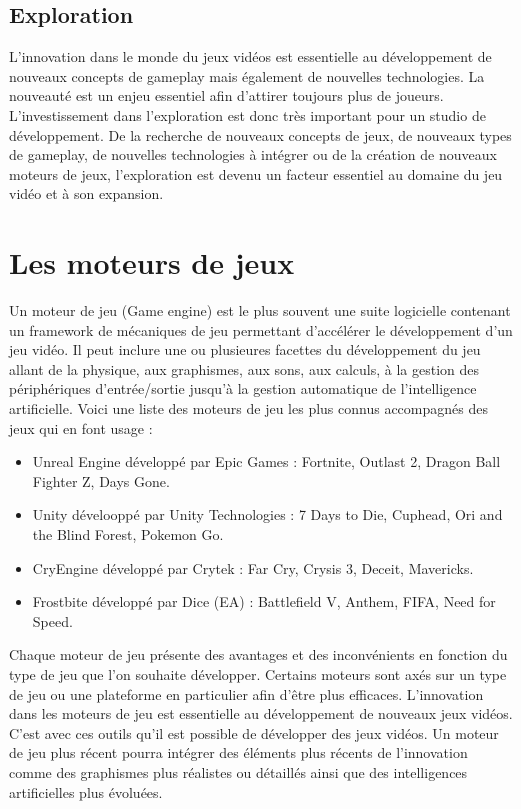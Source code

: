 \subsection{Exploration}
L'innovation dans le monde du jeux vidéos est essentielle au développement de nouveaux concepts de gameplay mais également de nouvelles technologies. La nouveauté est un enjeu essentiel afin d'attirer toujours plus de joueurs. L'investissement dans l'exploration est donc très important pour un studio de développement. De la recherche de nouveaux concepts de jeux, de nouveaux types de gameplay, de nouvelles technologies à intégrer ou de la création de nouveaux moteurs de jeux, l'exploration est devenu un facteur essentiel au domaine du jeu vidéo et à son expansion.



\section{Les moteurs de jeux}
Un moteur de jeu (Game engine) est le plus souvent une suite logicielle contenant un framework de mécaniques de jeu permettant d'accélérer le développement d'un jeu vidéo. Il peut inclure une ou plusieures facettes du développement du jeu allant de la physique, aux graphismes, aux sons, aux calculs, à la gestion des périphériques d'entrée/sortie jusqu'à la gestion automatique de l'intelligence artificielle. Voici une liste des moteurs de jeu les plus connus accompagnés des jeux qui en font usage : 
\begin{itemize}
    \item Unreal Engine développé par Epic Games : Fortnite, Outlast 2, Dragon Ball Fighter Z, Days Gone.
    \item Unity dévelooppé par Unity Technologies : 7 Days to Die, Cuphead, Ori and the Blind Forest, Pokemon Go.
    \item CryEngine développé par Crytek : Far Cry, Crysis 3, Deceit, Mavericks.
    \item Frostbite développé par Dice (EA) : Battlefield V, Anthem, FIFA, Need for Speed.
\end{itemize}

Chaque moteur de jeu présente des avantages et des inconvénients en fonction du type de jeu que l'on souhaite développer. Certains moteurs sont axés sur un type de jeu ou une plateforme en particulier afin d'être plus efficaces. L'innovation dans les moteurs de jeu est essentielle au développement de nouveaux jeux vidéos. C'est avec ces outils qu'il est possible de développer des jeux vidéos. Un moteur de jeu plus récent pourra intégrer des éléments plus récents de l'innovation comme des graphismes plus réalistes ou détaillés ainsi que des intelligences artificielles plus évoluées.

